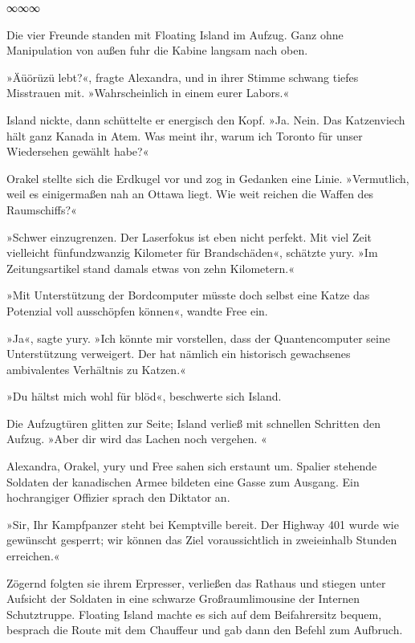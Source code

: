 \begin{center}
∞∞∞
\end{center}

Die vier Freunde standen mit Floating Island im Aufzug. Ganz ohne Manipulation von außen fuhr die Kabine langsam nach oben.

»Äüörüzü lebt?«, fragte Alexandra, und in ihrer Stimme schwang tiefes Misstrauen mit. »Wahrscheinlich in einem eurer Labors.«

Island nickte, dann schüttelte er energisch den Kopf. »Ja. Nein. Das Katzenviech hält ganz Kanada in Atem. Was meint ihr, warum ich Toronto für unser Wiedersehen gewählt habe?«

Orakel stellte sich die Erdkugel vor und zog in Gedanken eine Linie. »Vermutlich, weil es einigermaßen nah an Ottawa liegt. Wie weit reichen die Waffen des Raumschiffs?«

»Schwer einzugrenzen. Der Laserfokus ist eben nicht perfekt. Mit viel Zeit vielleicht fünfundzwanzig Kilometer für Brandschäden«, schätzte yury. »Im Zeitungsartikel stand damals etwas von zehn Kilometern.«

»Mit Unterstützung der Bordcomputer müsste doch selbst eine Katze das Potenzial voll ausschöpfen können«, wandte Free ein.

»Ja«, sagte yury. »Ich könnte mir vorstellen, dass der Quantencomputer seine Unterstützung verweigert. Der hat nämlich ein historisch gewachsenes ambivalentes Verhältnis zu Katzen.«

»Du hältst mich wohl für blöd«, beschwerte sich Island.


Die Aufzugtüren glitten zur Seite; Island verließ mit schnellen Schritten den Aufzug. »Aber dir wird das Lachen noch vergehen. «

Alexandra, Orakel, yury und Free sahen sich erstaunt um. Spalier stehende Soldaten der kanadischen Armee bildeten eine Gasse zum Ausgang. Ein hochrangiger Offizier sprach den Diktator an.

»Sir, Ihr Kampfpanzer steht bei Kemptville bereit. Der Highway 401 wurde wie gewünscht gesperrt; wir können das Ziel voraussichtlich in zweieinhalb Stunden erreichen.«

Zögernd folgten sie ihrem Erpresser, verließen das Rathaus und stiegen unter Aufsicht der Soldaten in eine schwarze Großraumlimousine der Internen Schutztruppe. Floating Island machte es sich auf dem Beifahrersitz bequem, besprach die Route mit dem Chauffeur und gab dann den Befehl zum Aufbruch.

